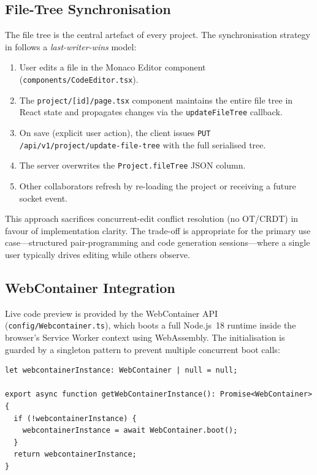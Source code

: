 \subsection{File-Tree Synchronisation}

The file tree is the central artefact of every project. The synchronisation
strategy in \echoray{} follows a \emph{last-writer-wins} model:

\begin{enumerate}[leftmargin=*, label=\arabic*.]
  \item User edits a file in the Monaco Editor component
    (\texttt{components/CodeEditor.tsx}).
  \item The \texttt{project/[id]/page.tsx} component maintains the entire
    file tree in React state and propagates changes via the
    \texttt{updateFileTree} callback.
  \item On save (explicit user action), the client issues
    \texttt{PUT /api/v1/project/update-file-tree} with the full serialised
    tree.
  \item The server overwrites the \texttt{Project.fileTree} JSON column.
  \item Other collaborators refresh by re-loading the project or receiving
    a future socket event.
\end{enumerate}

This approach sacrifices concurrent-edit conflict resolution (no OT/CRDT) in
favour of implementation clarity. The trade-off is appropriate for the primary
use case---structured pair-programming and code generation sessions---where a
single user typically drives editing while others observe.

\subsection{WebContainer Integration}

Live code preview is provided by the WebContainer API
(\texttt{config/Webcontainer.ts}), which boots a full Node.js~18 runtime
inside the browser's Service Worker context using WebAssembly. The
initialisation is guarded by a singleton pattern to prevent multiple
concurrent boot calls:

\begin{lstlisting}[caption={WebContainer singleton initialisation.},
  label=lst:wc]
let webcontainerInstance: WebContainer | null = null;

export async function getWebContainerInstance(): Promise<WebContainer> {
  if (!webcontainerInstance) {
    webcontainerInstance = await WebContainer.boot();
  }
  return webcontainerInstance;
}
\end{lstlisting}

